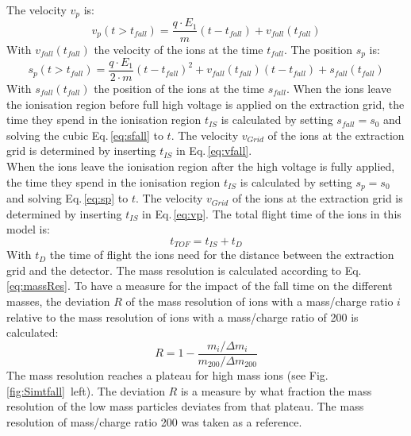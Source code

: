 	The velocity $v_{p}$ is:
	\begin{equation}
		v_{p}(t > t_{fall}) = \frac{q\cdot E_1}{m}(t-t_{fall}) + v_{fall}(t_{fall})
		\label{eq:vp}
	\end{equation}
	With $v_{fall}(t_{fall})$ the velocity of the ions at the time $t_{fall}$. The position $s_{p}$ is:
	\begin{equation}
		s_{p}(t > t_{fall}) = \frac{q\cdot E_1}{2\cdot m}(t-t_{fall})^2 + v_{fall}(t_{fall})(t-t_{fall}) + s_{fall}(t_{fall})
		\label{eq:sp}
	\end{equation}
	With $s_{fall}(t_{fall})$ the position of the ions at the time $s_{fall}$. When the ions leave the ionisation region before full high voltage is applied on the extraction grid, the time they spend in the ionisation region $t_{IS}$ is calculated by setting $s_{fall}=s_0$ and solving the cubic Eq.\,\eqref{eq:sfall} to $t$. The velocity $v_{Grid}$ of the ions at the extraction grid is determined by inserting $t_{IS}$ in Eq.\,\eqref{eq:vfall}.\\
	When the ions leave the ionisation region after the high voltage is fully applied, the time they spend in the ionisation region $t_{IS}$ is calculated by setting $s_{p}=s_0$ and solving Eq.\,\eqref{eq:sp} to $t$. The velocity $v_{Grid}$ of the ions at the extraction grid is determined by inserting $t_{IS}$ in Eq.\,\eqref{eq:vp}. The total flight time of the ions in this model is:
	\begin{equation}
		t_{TOF} = t_{IS} + t_D
	\end{equation}
	With $t_{D}$ the time of flight the ions need for the distance between the extraction grid and the detector. The mass resolution is calculated according to Eq.\,\eqref{eq:massRes}. To have a measure for the impact of the fall time on the different masses, the deviation $R$ of the mass resolution of ions with a mass/charge ratio $i$ relative to the mass resolution of ions with a mass/charge ratio of 200 is calculated:
	\begin{equation}
		R = 1 - \frac{m_i/\Delta m_i}{m_{200}/\Delta m_{200}}
	\end{equation}
	The mass resolution reaches a plateau for high mass ions (see Fig.\,\ref{fig:Simtfall}~left). The deviation $R$ is a measure by what fraction the mass resolution of the low mass particles deviates from that plateau. The mass resolution of mass/charge ratio 200 was taken as a reference.
